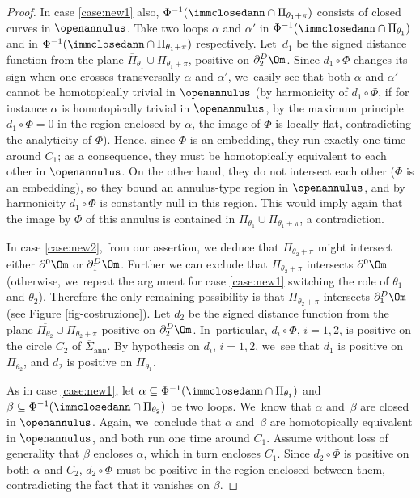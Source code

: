 \begin{proof}
In case \ref{case:new1} also, $\Phi^{-1}(\immclosedann\cap \Pi_{\theta_1+\pi})$ consists of closed curves in $\openannulus$.
Take two loops $\alpha$ and $\alpha'$ in $ \Phi^{-1}(
\immclosedann\cap \Pi_{\theta_1})$ and in $ \Phi^{-1}(
\immclosedann\cap \Pi_{\theta_1+\pi})$ respectively.
Let~$d_1$ be the signed distance function from the plane $\overline\Pi_{\theta_1}\cup\Pi_{\theta_1+\pi}$, positive on $\partial_2^D\Om$. Since $d_1\circ\Phi$ changes its sign when one crosses
transversally $\alpha$ and $\alpha'$, we~easily see that both $\alpha$ and $\alpha'$ cannot be homotopically trivial in $\openannulus$ (by harmonicity of $d_1\circ\Phi$, if for instance $\alpha $ is homotopically trivial in $\openannulus$, by the maximum principle $d_1\circ\Phi=0$ in the region enclosed by $\alpha$, \ie the image of $\Phi$ is locally flat, contradicting the analyticity of $\Phi$). Hence, since $\Phi$ is an embedding, they run exactly one time around $C_1$; as a consequence, they must be homotopically equivalent to each other in $\openannulus$. On the other hand, they do not intersect each other
($\Phi$ is an embedding), so they bound an annulus-type region in $\openannulus$, and by harmonicity $d_1\circ\Phi$ is constantly null in this region.
This would imply again that the image by $\Phi$ of this annulus is contained in $\overline \Pi_{\theta_1}\cup\Pi_{\theta_1+\pi}$, a contradiction.

In case \ref{case:new2}, from our assertion, we
deduce that $\Pi_{\theta_2+\pi}$ might intersect either $\partial^0\Om$ or $\partial^D_1\Om$.
Further we can exclude that $\Pi_{\theta_2+\pi}$ intersects $\partial^0\Om$ (otherwise, we~repeat the argument for case \ref{case:new1} switching the role of $\theta_1$ and $\theta_2$).
Therefore the only remaining possibility is that $\Pi_{\theta_2+\pi}$ intersects $\partial_1^D\Om$ (see Figure \ref{fig-costruzione}).
Let $d_2$ be the signed distance function from the plane $\overline{\Pi_{\theta_2}}\cup\Pi_{\theta_2+\pi}$ positive on $\partial_2^D\Om$. In~particular, $d_i\circ\Phi$, $i=1,2$, is positive on the circle $C_2$ of
$\overline\Sigma_\mathrm{ann}$. By hypothesis on $d_i$, $i=1,2$, we~see that $d_1$ is positive on $\Pi_{\theta_2}$, and $d_2$ is positive on $\Pi_{\theta_1}$.

As in case \ref{case:new1}, let $\alpha\subseteq \Phi^{-1}(\immclosedann\cap \Pi_{\theta_1})$ and
$\beta\subseteq \Phi^{-1}(\immclosedann\cap \Pi_{\theta_2})$
be two loops. We~know that $\alpha$ and~$\beta$ are closed in $\openannulus$.
Again, we~conclude that $\alpha$ and~$\beta$ are homotopically equivalent in $\openannulus$, and both run one time around $C_1$. Assume without loss of generality that $\beta$ encloses $\alpha$, which in turn encloses $C_1$. Since $d_2\circ\Phi$ is positive on both $\alpha$ and $C_2$, $d_2\circ\Phi$ must be positive in the region enclosed between them, contradicting the fact that it
vanishes on $\beta$.


\end{proof}

